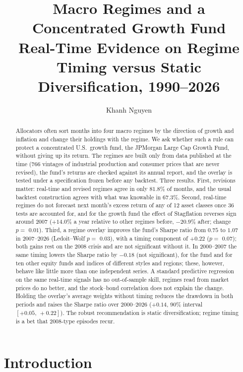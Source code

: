 \documentclass[11pt,a4paper]{article}
\title{\textbf{Macro Regimes and a Concentrated Growth Fund}\\[0.4em]
\large Real-Time Evidence on Regime Timing versus Static Diversification, 1990--2026}
\author{Khanh Nguyen}
\date{}
\begin{document}
\maketitle

\begin{abstract}
\noindent Allocators often sort months into four macro regimes by the direction of growth and inflation and
change their holdings with the regime. We ask whether such a rule can protect a concentrated U.S.\ growth
fund, the JPMorgan Large Cap Growth Fund, without giving up its return. The regimes are built only from data
published at the time (766 vintages of industrial production and consumer prices that are never
revised), the fund's returns are checked against its annual report, and the overlay is tested under a
specification frozen before any backtest. Three results. First, revisions matter: real-time and revised
regimes agree in only $81.8\%$ of months, and the usual backtest construction agrees with what was
knowable in $67.3\%$. Second, real-time regimes do not forecast next month's excess return of any of
12 asset classes once 36 tests are accounted for, and for the growth fund the effect of
Stagflation reverses sign around 2007 ($+14.0\%$ a year relative to other regimes before, $-20.9\%$ after; change $p=$ $0.01$).
Third, a regime overlay improves the fund's Sharpe ratio from $0.75$ to $1.07$ in 2007--2026
(Ledoit--Wolf $p=$ $0.03$), with a timing component of $+0.22$ ($p=$ $0.07$); both gains rest on the
2008 crisis and are not significant without it. In 2000--2007 the same timing lowers the Sharpe ratio by
$-0.18$ (not significant), for the fund and for ten other equity funds and indices of different styles and
regions; these, however, behave like little more than one independent series. A standard predictive regression on the same real-time signals has no out-of-sample skill, regimes read from market prices do no better, and the
stock--bond correlation does not explain the change. Holding the overlay's average weights without timing
reduces the drawdown in both periods and raises the Sharpe ratio over 2000--2026 ($+0.14$, 90\% interval
$[+0.05,\ +0.22]$). The robust recommendation is static diversification; regime timing is a bet that 2008-type episodes recur.
\end{abstract}

\section{Introduction}
\label{sec:intro}
\end{document}
